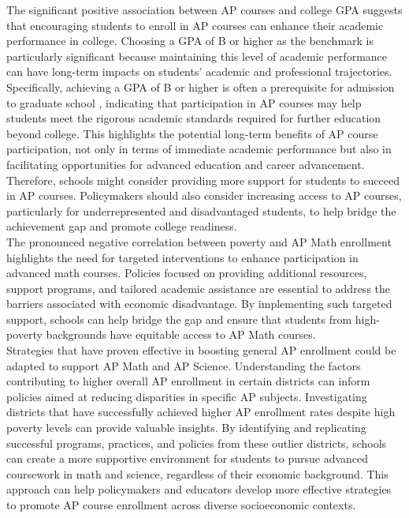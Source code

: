 \documentclass[sn-mathphys-num]{sn-jnl}%
\theoremstyle{thmstyleone}%
\theoremstyle{thmstyletwo}%
\theoremstyle{thmstylethree}%
\begin{document}
{The significant positive association between AP courses and college GPA suggests that encouraging students to enroll in AP courses can enhance their academic performance in college. Choosing a GPA of B or higher as the benchmark is particularly significant because maintaining this level of academic performance can have long-term impacts on students' academic and professional trajectories. Specifically, achieving a GPA of B or higher is often a prerequisite for admission to graduate school \cite{keith-spiegel_wiederman_2000}, indicating that participation in AP courses may help students meet the rigorous academic standards required for further education beyond college. This highlights the potential long-term benefits of AP course participation, not only in terms of immediate academic performance but also in facilitating opportunities for advanced education and career advancement. Therefore, schools might consider providing more support for students to succeed in AP courses. Policymakers should also consider increasing access to AP courses, particularly for underrepresented and disadvantaged students, to help bridge the achievement gap and promote college readiness.\\

The pronounced negative correlation between poverty and AP Math enrollment highlights the need for targeted interventions to enhance participation in advanced math courses. Policies focused on providing additional resources, support programs, and tailored academic assistance are essential to address the barriers associated with economic disadvantage. By implementing such targeted support, schools can help bridge the gap and ensure that students from high-poverty backgrounds have equitable access to AP Math courses.\\

Strategies that have proven effective in boosting general AP enrollment could be adapted to support AP Math and AP Science. Understanding the factors contributing to higher overall AP enrollment in certain districts can inform policies aimed at reducing disparities in specific AP subjects. Investigating districts that have successfully achieved higher AP enrollment rates despite high poverty levels can provide valuable insights. By identifying and replicating successful programs, practices, and policies from these outlier districts, schools can create a more supportive environment for students to pursue advanced coursework in math and science, regardless of their economic background. This approach can help policymakers and educators develop more effective strategies to promote AP course enrollment across diverse socioeconomic contexts.\\

}
\end{document}
